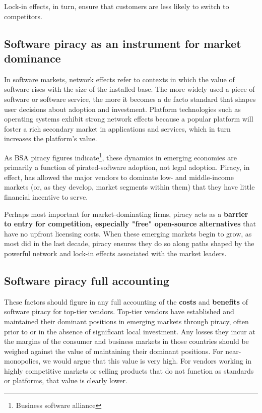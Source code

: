 \documentclass[times, utf8, seminar]{fit}
\begin{document}
Lock-in effects, in turn, ensure that customers are less likely to switch to competitors.

\subsection{Software piracy as an instrument for market dominance}  

In software markets, network effects refer to contexts in which the value of software rises with the size of the installed base. The more widely used a piece of software or software service, the more it becomes a de facto standard that shapes user decisions about adoption and investment. Platform technologies such as operating systems exhibit strong network effects because a popular platform will foster a rich secondary market in applications and services, which in turn increases the platform’s value. 

As BSA piracy figures indicate\footnote{Business software alliance}, these dynamics in emerging economies are primarily a function of pirated-software adoption, not legal adoption. Piracy, in effect, has allowed the major vendors to dominate low- and middle-income markets (or, as they develop, market segments within them) that they have little financial incentive to serve. 

Perhaps most important for market-dominating firms, piracy acts as a \textbf{barrier to entry for competition, especially "free" open-source alternatives} that have no upfront licensing costs. When these emerging markets begin to grow, as most did in the last decade, piracy ensures they do so along paths shaped by the powerful network and lock-in effects associated with the market leaders.

\subsection{Software piracy full accounting}

These factors should figure in any full accounting of the \textbf{costs} and \textbf{benefits} of software piracy for top-tier vendors. Top-tier vendors have established and maintained their dominant positions in emerging markets through piracy, often prior to or in the absence of significant local investment. Any losses they incur at the margins of the consumer and business markets in those countries should be weighed against the value of maintaining their dominant positions. For near-monopolies, we would argue that this value is very high. For vendors working in highly competitive markets or selling products that do not function as standards or platforms, that value is clearly lower.\citep{mediapiracy}
\end{document}
